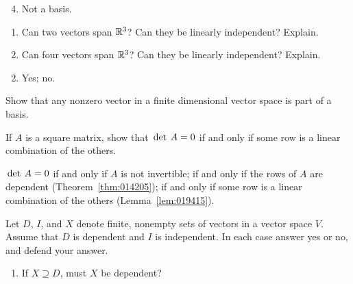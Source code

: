 \begin{multicols}{2}
\begin{ex}
\begin{sol}
\begin{enumerate}[label={\alph*.}]
\setcounter{enumi}{3}
\item  Not a basis.

\end{enumerate}
\end{sol}
\end{ex}

\begin{ex}
\begin{enumerate}[label={\alph*.}]
\item Can two vectors span $\mathbb{R}^3$? Can they be linearly independent? Explain.

\item Can four vectors span $\mathbb{R}^3$? Can they be linearly independent? Explain.

\end{enumerate}
\begin{sol}
\begin{enumerate}[label={\alph*.}]
\setcounter{enumi}{1}
\item  Yes; no.

\end{enumerate}
\end{sol}
\end{ex}

\begin{ex}
Show that any nonzero vector in a finite dimensional vector space is part of a basis.
\end{ex}

\begin{ex}
If $A$ is a square matrix, show that $\thinspace\operatorname{det\medspace} A = 0$ if and only if some row is a linear combination of the others.

\begin{sol}
$\thinspace\operatorname{det\medspace} A = 0$ if and only if $A$ is not invertible; if and only if the rows of $A$ are dependent (Theorem~\ref{thm:014205}); if and only if some row is a linear combination of the others (Lemma~\ref{lem:019415}).
\end{sol}
\end{ex}

\begin{ex}
Let $D$, $I$, and $X$ denote finite, nonempty sets of vectors in a vector space $V$. Assume that $D$ is dependent and $I$ is independent. In each case answer yes or no, and defend your answer.

\begin{enumerate}[label={\alph*.}]
\item If $X \supseteq D$, must $X$ be dependent?


\end{enumerate}
\end{ex}
\end{multicols}
